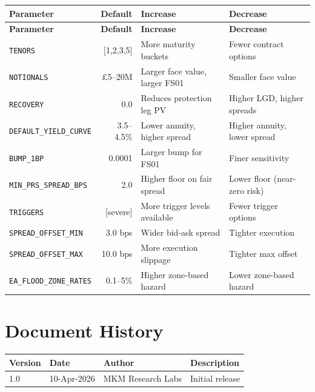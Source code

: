 \documentclass[11pt,a4paper]{article}
\begin{document}
\begin{longtable}{p{4.2cm}rp{3.5cm}p{3.5cm}}
\toprule
\textbf{Parameter} & \textbf{Default} & \textbf{Increase} & \textbf{Decrease} \\
\midrule
\endfirsthead
\toprule
\textbf{Parameter} & \textbf{Default} & \textbf{Increase} & \textbf{Decrease} \\
\midrule
\endhead
\texttt{TENORS} & [1,2,3,5] &
  More maturity buckets &
  Fewer contract options \\[4pt]
\texttt{NOTIONALS} & \pounds5--20M &
  Larger face value, larger FS01 &
  Smaller face value \\[4pt]
\texttt{RECOVERY} & 0.0 &
  Reduces protection leg PV &
  Higher LGD, higher spreads \\[4pt]
\texttt{DEFAULT\_YIELD\_CURVE} & 3.5--4.5\% &
  Lower annuity, higher spread &
  Higher annuity, lower spread \\[4pt]
\texttt{BUMP\_1BP} & 0.0001 &
  Larger bump for FS01 &
  Finer sensitivity \\[4pt]
\texttt{MIN\_PRS\_SPREAD\_BPS} & 2.0 &
  Higher floor on fair spread &
  Lower floor (near-zero risk) \\[4pt]
\texttt{TRIGGERS} & [severe] &
  More trigger levels available &
  Fewer trigger options \\[4pt]
\texttt{SPREAD\_OFFSET\_MIN} & 3.0 bps &
  Wider bid-ask spread &
  Tighter execution \\[4pt]
\texttt{SPREAD\_OFFSET\_MAX} & 10.0 bps &
  More execution slippage &
  Tighter max offset \\[4pt]
\texttt{EA\_FLOOD\_ZONE\_RATES} & 0.1--5\% &
  Higher zone-based hazard &
  Lower zone-based hazard \\
\bottomrule
\end{longtable}


\section*{Document History}

\begin{tabular}{llll}
\toprule
\textbf{Version} & \textbf{Date} & \textbf{Author} & \textbf{Description} \\
\midrule
1.0 & 10-Apr-2026 & MKM Research Labs & Initial release \\
\bottomrule
\end{tabular}
\end{document}
